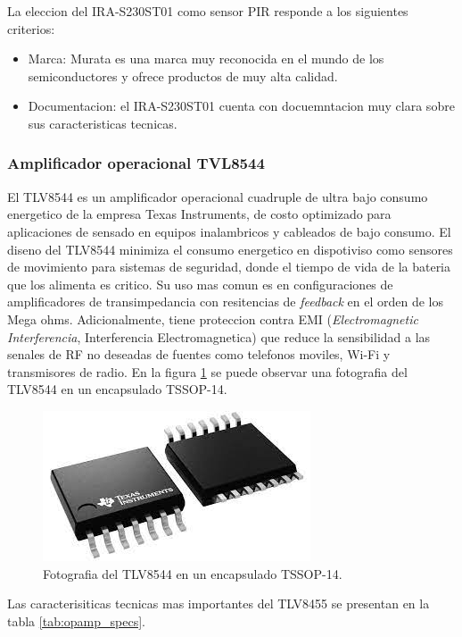 La eleccion del IRA-S230ST01 como sensor PIR responde a los siguientes criterios:
\begin{itemize}
	\item Marca: Murata es una marca muy reconocida en el mundo de los semiconductores y ofrece productos de muy alta calidad.
	\item Documentacion: el IRA-S230ST01 cuenta con docuemntacion muy clara sobre sus caracteristicas tecnicas.
\end{itemize}

\subsubsection{Amplificador operacional TVL8544}
El TLV8544 es un amplificador operacional cuadruple de ultra bajo consumo energetico de la empresa Texas Instruments, de costo optimizado para aplicaciones de sensado en equipos inalambricos y cableados de bajo consumo. El diseno del TLV8544 minimiza el consumo energetico en dispotiviso como sensores de movimiento para sistemas de seguridad, donde el tiempo de vida de la bateria que los alimenta es critico. Su uso mas comun es en configuraciones de amplificadores de transimpedancia con resitencias de \textit{feedback} en el orden de los Mega ohms. Adicionalmente, tiene proteccion contra EMI (\textit{Electromagnetic Interferencia}, Interferencia Electromagnetica) que reduce la sensibilidad a las senales de RF no deseadas de fuentes como telefonos moviles, Wi-Fi y transmisores de radio. En la figura \ref{fig:opamp_photo} se puede observar una fotografia del TLV8544 en un encapsulado TSSOP-14.

\begin{figure}[h]
	\centering
	\includegraphics[scale=0.4]{./Figures/opamp_photo.jpeg}
	\caption{Fotografia del TLV8544 en un encapsulado TSSOP-14.}
	\label{fig:opamp_photo}
\end{figure}

Las caracterisiticas tecnicas mas importantes del TLV8455 se presentan en la tabla \ref{tab:opamp_specs}.

